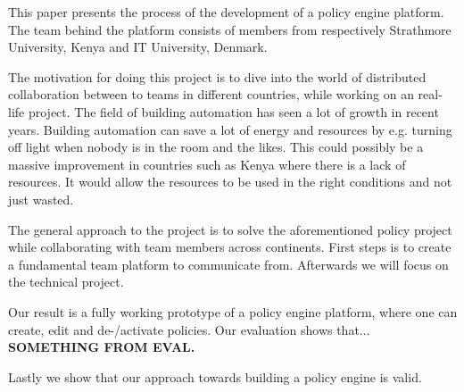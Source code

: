 This paper presents the process of the development of a policy engine platform. The team behind the platform consists of members from respectively Strathmore University, Kenya and IT University, Denmark. 

The motivation for doing this project is to dive into the world of distributed collaboration between to teams in different countries, while working on an real-life project. The field of building automation has seen a lot of growth in recent years. Building automation can save a lot of energy and resources by e.g. turning off light when nobody is in the room and the likes. This could possibly be a massive improvement in countries such as Kenya where there is a lack of resources. It would allow the resources to be used in the right conditions and not just wasted.

The general approach to the project is to solve the aforementioned policy project while collaborating with team members across continents. First steps is to create a fundamental team platform to communicate from. Afterwards we will focus on the technical project.

Our result is a fully working prototype of a policy engine platform, where one can create, edit and de-/activate policies. Our evaluation shows that... \textbf{SOMETHING FROM EVAL.}

Lastly we show that our approach towards building a policy engine is valid. 